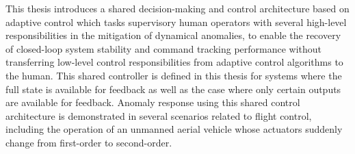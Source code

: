 This thesis introduces a shared decision-making and control architecture based on adaptive control which tasks supervisory human operators with several high-level responsibilities in the mitigation of dynamical anomalies, to enable the recovery of closed-loop system stability and command tracking performance without transferring low-level control responsibilities from adaptive control algorithms to the human. This shared controller is defined in this thesis for systems where the full state is available for feedback as well as the case where only certain outputs are available for feedback. Anomaly response using this shared control architecture is demonstrated in several scenarios related to flight control, including the operation of an unmanned aerial vehicle whose actuators suddenly change from first-order to second-order. 